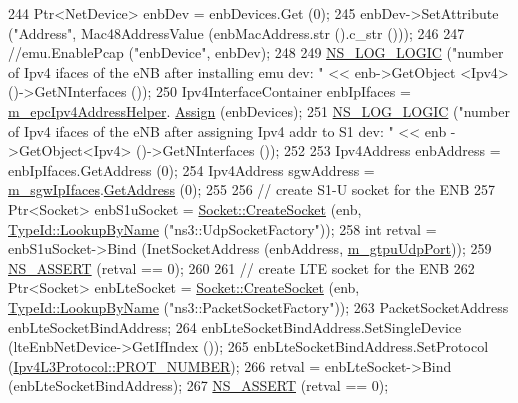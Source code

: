 \begin{DoxyCode}
244   Ptr<NetDevice> enbDev = enbDevices.Get (0);
245   enbDev->SetAttribute (\textcolor{stringliteral}{"Address"}, Mac48AddressValue (enbMacAddress.str ().c\_str ()));
246 
247   \textcolor{comment}{//emu.EnablePcap ("enbDevice", enbDev);}
248 
249   \hyperlink{group__logging_ga88acd260151caf2db9c0fc84997f45ce}{NS\_LOG\_LOGIC} (\textcolor{stringliteral}{"number of Ipv4 ifaces of the eNB after installing emu dev: "} << enb->GetObject
      <Ipv4> ()->GetNInterfaces ());  
250   Ipv4InterfaceContainer enbIpIfaces = \hyperlink{classns3_1_1EmuEpcHelper_a53dccacd37ee9a31fbd739762a615c1b}{m\_epcIpv4AddressHelper}.
      \hyperlink{classns3_1_1Ipv4AddressHelper_af8e7f4a1a7e74c00014a1eac445a27af}{Assign} (enbDevices);
251   \hyperlink{group__logging_ga88acd260151caf2db9c0fc84997f45ce}{NS\_LOG\_LOGIC} (\textcolor{stringliteral}{"number of Ipv4 ifaces of the eNB after assigning Ipv4 addr to S1 dev: "} << enb
      ->GetObject<Ipv4> ()->GetNInterfaces ());
252   
253   Ipv4Address enbAddress = enbIpIfaces.GetAddress (0);
254   Ipv4Address sgwAddress = \hyperlink{classns3_1_1EmuEpcHelper_aec4d868be3d7593b66f0e87fc59055f1}{m\_sgwIpIfaces}.\hyperlink{classns3_1_1Ipv4InterfaceContainer_ae63208dcd222be986822937ee4aa828c}{GetAddress} (0);
255 
256   \textcolor{comment}{// create S1-U socket for the ENB}
257   Ptr<Socket> enbS1uSocket = \hyperlink{classns3_1_1Socket_ad448a62bb50ad3dbac59c879a885a8d2}{Socket::CreateSocket} (enb, 
      \hyperlink{classns3_1_1TypeId_a119cf99c20931fdc294602cd360b180e}{TypeId::LookupByName} (\textcolor{stringliteral}{"ns3::UdpSocketFactory"}));
258   \textcolor{keywordtype}{int} retval = enbS1uSocket->Bind (InetSocketAddress (enbAddress, \hyperlink{classns3_1_1EmuEpcHelper_a99fe0fcbc0bd3668f30cf6ae53377a22}{m\_gtpuUdpPort}));
259   \hyperlink{assert_8h_a6dccdb0de9b252f60088ce281c49d052}{NS\_ASSERT} (retval == 0);
260     
261   \textcolor{comment}{// create LTE socket for the ENB }
262   Ptr<Socket> enbLteSocket = \hyperlink{classns3_1_1Socket_ad448a62bb50ad3dbac59c879a885a8d2}{Socket::CreateSocket} (enb, 
      \hyperlink{classns3_1_1TypeId_a119cf99c20931fdc294602cd360b180e}{TypeId::LookupByName} (\textcolor{stringliteral}{"ns3::PacketSocketFactory"}));
263   PacketSocketAddress enbLteSocketBindAddress;
264   enbLteSocketBindAddress.SetSingleDevice (lteEnbNetDevice->GetIfIndex ());
265   enbLteSocketBindAddress.SetProtocol (\hyperlink{classns3_1_1Ipv4L3Protocol_a0146bc84815b7b73adb9c62cdafc9442}{Ipv4L3Protocol::PROT\_NUMBER});
266   retval = enbLteSocket->Bind (enbLteSocketBindAddress);
267   \hyperlink{assert_8h_a6dccdb0de9b252f60088ce281c49d052}{NS\_ASSERT} (retval == 0);  

\end{DoxyCode}

